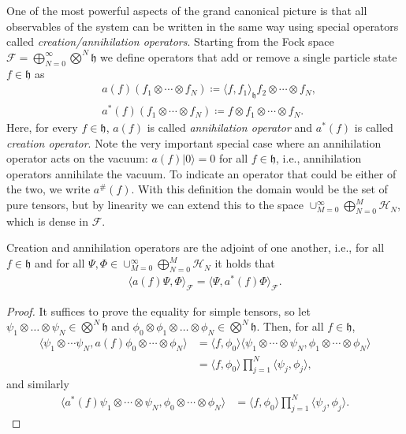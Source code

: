 One of the most powerful aspects of the grand canonical picture is that all observables of the
system can be written in the same way using special operators called \textit{creation/annihilation
operators}. Starting from the Fock space $\mathcal{F} = \bigoplus_{N=0}^\infty\bigotimes^N\mathfrak{h}$
we define operators that add or remove a single particle state $f\in\mathfrak{h}$ as
\begin{align}
\label{eq:creation-annihilation}
	&a(f)(f_1\otimes\cdots\otimes f_N) \coloneq \langle f,f_1\rangle_\mathfrak{h} f_2\otimes\cdots\otimes f_N,\\
	&a^*(f)(f_1\otimes\cdots\otimes f_N) \coloneq f\otimes f_1\otimes\cdots\otimes f_N.\nonumber
\end{align}
Here, for every $f\in\mathcal{\mathfrak{h}}$, $a(f)$ is called \textit{annihilation operator}
and $a^*(f)$ is called \textit{creation operator}. Note the very important special case where
an annihilation operator acts on the vacuum: $a(f)|0\rangle = 0$ for all $f\in\mathfrak{h}$,
i.e., annihilation operators annihilate the vacuum. To indicate an operator that could be
either of the two, we write $a^\#(f)$. With this definition the domain would be the set of
pure tensors, but by linearity we can extend this to the space
$\cup_{M=0}^\infty \bigoplus_{N=0}^M \mathcal{H}_N$, which is dense in $\mathcal{F}$.

\begin{proposition}
	Creation and annihilation operators are the adjoint of one another, i.e., for all
	$f\in\mathfrak{h}$ and for all $\Psi,\Phi\in\cup_{M=0}^\infty\bigoplus_{N=0}^M
	\mathcal{H}_N$ it holds that
	\begin{align*}
		\langle a(f)\Psi,\Phi \rangle_\mathcal{F} = \langle \Psi, a^*(f)\Phi \rangle_\mathcal{F}.
	\end{align*}
\end{proposition}
\begin{proof}
	It suffices to prove the equality for simple tensors, so let $\psi_1\otimes\ldots\otimes
	\psi_N\in\bigotimes^N\mathfrak{h}$ and $\phi_0\otimes\phi_1\otimes\ldots\otimes\phi_N\in
	\bigotimes^N\mathfrak{h}$. Then, for all $f\in\mathfrak{h}$,
	\begin{align*}
		\langle\psi_1\otimes\cdots\psi_N,a(f)\phi_0\otimes\cdots\otimes\phi_N\rangle
		&= \langle f,\phi_0\rangle\langle\psi_1\otimes\cdots\otimes\psi_N,\phi_1\otimes\cdots\otimes\phi_N\rangle\\
		&= \langle f,\phi_0\rangle\prod_{j=1}^N\langle\psi_j,\phi_j\rangle,
	\end{align*}
	and similarly
	\begin{align*}
		\langle a^*(f)\psi_1\otimes\cdots\otimes\psi_N,\phi_0\otimes\cdots\otimes\phi_N\rangle
		&= \langle f,\phi_0\rangle\prod_{j=1}^N\langle\psi_j,\phi_j\rangle.
	\end{align*}
\end{proof}

